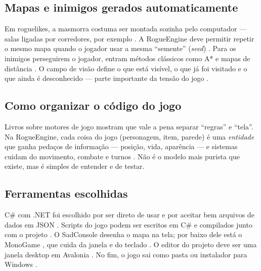 \documentclass[12pt]{article}
\begin{document}
\subsection{Mapas e inimigos gerados automaticamente}

Em roguelikes, a masmorra costuma ser montada sozinha pelo computador --- salas ligadas por
corredores, por exemplo \citep{hendrikx2013,togelius2011,shaker2016,togelius2016}. A
RogueEngine deve permitir repetir o mesmo mapa quando o jogador usar a mesma ``semente''
(\textit{seed}) \citep{togelius2011,hendrikx2011}. Para os inimigos perseguirem o jogador,
entram métodos clássicos como A* \citep{hart1968,patel2014} e mapas de distância
\citep{roguebasin_dijkstra,patel2014}. O campo de visão \citep{patel2016} define o que está
visível, o que já foi visitado e o que ainda é desconhecido --- parte importante da tensão do
jogo \citep{berlin2008,wild2018}.

\subsection{Como organizar o código do jogo}

Livros sobre motores de jogo \citep{gregory2018} mostram que vale a pena separar ``regras'' e
``tela''. Na RogueEngine, cada coisa do jogo (personagem, item, parede) é uma \textit{entidade}
que ganha pedaços de informação --- posição, vida, aparência --- e sistemas cuidam do
movimento, combate e turnos \citep{gamma1994,nystrom2014,bjorge2015,martin2017,sommerville2015}.
Não é o modelo mais purista que existe, mas é simples de entender e de testar.

\subsection{Ferramentas escolhidas}

C\# com .NET \citep{dotnet2024,pinheiro2020} foi escolhido por ser direto de usar e por aceitar
bem arquivos de dados em JSON \citep{jsonschema2024}. Scripts do jogo podem ser escritos em C\#
e compilados junto com o projeto \citep{roslyn2024}. O SadConsole \citep{sadconsole2024} desenha
o mapa na tela; por baixo dele está o MonoGame \citep{monogame2024}, que cuida da janela e do
teclado \citep{craddock2015,sadconsole2024}. O editor do projeto deve ser uma janela desktop em
Avalonia \citep{avalonia2024,martin2017,fowler2002}. No fim, o jogo sai como pasta ou
instalador para Windows \citep{wix2024,netpublish2024,dotnet2024}.
\end{document}
